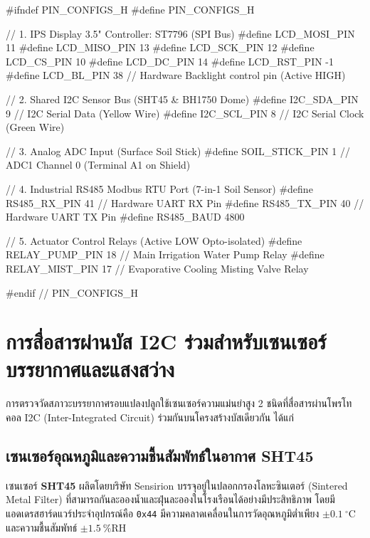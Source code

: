 \begin{pythonbox}
#ifndef PIN_CONFIGS_H
#define PIN_CONFIGS_H

// 1. IPS Display 3.5" Controller: ST7796 (SPI Bus)
#define LCD_MOSI_PIN    11
#define LCD_MISO_PIN    13
#define LCD_SCK_PIN     12
#define LCD_CS_PIN      10
#define LCD_DC_PIN      14
#define LCD_RST_PIN     -1
#define LCD_BL_PIN      38  // Hardware Backlight control pin (Active HIGH)

// 2. Shared I2C Sensor Bus (SHT45 & BH1750 Dome)
#define I2C_SDA_PIN     9   // I2C Serial Data (Yellow Wire)
#define I2C_SCL_PIN     8   // I2C Serial Clock (Green Wire)

// 3. Analog ADC Input (Surface Soil Stick)
#define SOIL_STICK_PIN  1   // ADC1 Channel 0 (Terminal A1 on Shield)

// 4. Industrial RS485 Modbus RTU Port (7-in-1 Soil Sensor)
#define RS485_RX_PIN    41  // Hardware UART RX Pin
#define RS485_TX_PIN    40  // Hardware UART TX Pin
#define RS485_BAUD      4800

// 5. Actuator Control Relays (Active LOW Opto-isolated)
#define RELAY_PUMP_PIN  18  // Main Irrigation Water Pump Relay
#define RELAY_MIST_PIN  17  // Evaporative Cooling Misting Valve Relay

#endif // PIN_CONFIGS_H
\end{pythonbox}

\section{การสื่อสารผ่านบัส I2C ร่วมสำหรับเซนเซอร์บรรยากาศและแสงสว่าง}

การตรวจวัดสภาวะบรรยากาศรอบแปลงปลูกใช้เซนเซอร์ความแม่นยำสูง 2 ชนิดที่สื่อสารผ่านโพรโทคอล I2C (Inter-Integrated Circuit) ร่วมกันบนโครงสร้างบัสเดียวกัน ได้แก่

\subsection{เซนเซอร์อุณหภูมิและความชื้นสัมพัทธ์ในอากาศ SHT45}
เซนเซอร์ \textbf{SHT45} ผลิตโดยบริษัท Sensirion บรรจุอยู่ในปลอกกรองโลหะซินเตอร์ (Sintered Metal Filter) ที่สามารถกันละอองน้ำและฝุ่นละอองในโรงเรือนได้อย่างมีประสิทธิภาพ โดยมีแอดเดรสฮาร์ดแวร์ประจำอุปกรณ์คือ \texttt{0x44} มีความคลาดเคลื่อนในการวัดอุณหภูมิต่ำเพียง $\pm 0.1\ ^\circ\text{C}$ และความชื้นสัมพัทธ์ $\pm 1.5\ \%\text{RH}$

